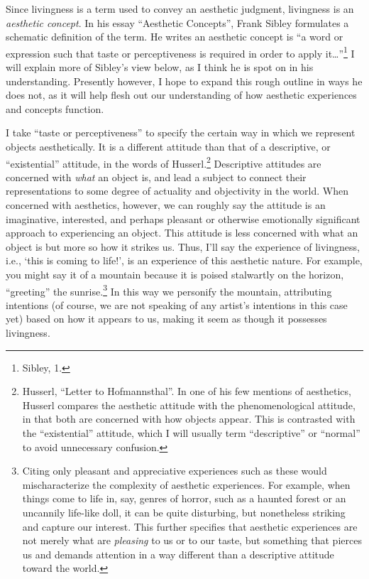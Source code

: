 Since livingness is a term used to convey an aesthetic judgment,
livingness is an \emph{aesthetic concept}. In his essay ``Aesthetic
Concepts'', Frank Sibley formulates a schematic definition of the term.
He writes an aesthetic concept is ``a word or expression such that taste
or perceptiveness is required in order to apply it\ldots''\footnote{Sibley,
  1.} I will explain more of Sibley's view below, as I think he is spot
on in his understanding. Presently however, I hope to expand this rough
outline in ways he does not, as it will help flesh out our understanding
of how aesthetic experiences and concepts function.

I take ``taste or perceptiveness'' to specify the certain way in which
we represent objects aesthetically. It is a different attitude than that
of a descriptive, or ``existential'' attitude, in the words of
Husserl.\footnote{Husserl, ``Letter to Hofmannsthal''. In one of his few
  mentions of aesthetics, Husserl compares the aesthetic attitude with
  the phenomenological attitude, in that both are concerned with how
  objects appear. This is contrasted with the ``existential'' attitude,
  which I will usually term ``descriptive'' or ``normal'' to avoid
  unnecessary confusion.} Descriptive attitudes are concerned with
\emph{what} an object is, and lead a subject to connect their
representations to some degree of actuality and objectivity in the
world. When concerned with aesthetics, however, we can roughly say the
attitude is an imaginative, interested, and perhaps pleasant or
otherwise emotionally significant approach to experiencing an object.
This attitude is less concerned with what an object is but more so how
it strikes us. Thus, I'll say the experience of livingness, i.e., `this
is coming to life!', is an experience of this aesthetic nature. For
example, you might say it of a mountain because it is poised stalwartly
on the horizon, ``greeting'' the sunrise.\footnote{Citing only pleasant
  and appreciative experiences such as these would mischaracterize the
  complexity of aesthetic experiences. For example, when things come to
  life in, say, genres of horror, such as a haunted forest or an
  uncannily life-like doll, it can be quite disturbing, but nonetheless
  striking and capture our interest. This further specifies that
  aesthetic experiences are not merely what are \emph{pleasing} to us or
  to our taste, but something that pierces us and demands attention in a
  way different than a descriptive attitude toward the world.} In this
way we personify the mountain, attributing intentions (of course, we are
not speaking of any artist's intentions in this case yet) based on how
it appears to us, making it seem as though it possesses livingness.

